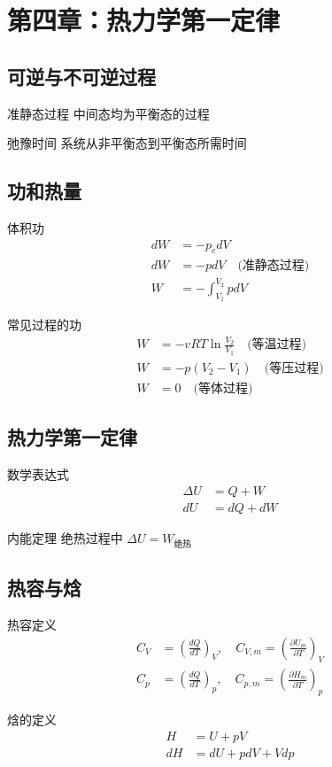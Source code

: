 \documentclass[12pt]{article}
\begin{document}
\section{第四章：热力学第一定律}
\subsection{可逆与不可逆过程}
准静态过程
中间态均为平衡态的过程

弛豫时间
系统从非平衡态到平衡态所需时间

\subsection{功和热量}
体积功
\begin{align*}
    dW &= -p_edV \\
    dW &= -pdV \quad \text{(准静态过程)} \\
    W &= -\int_{V_1}^{V_2} pdV
\end{align*}

常见过程的功
\begin{align*}
    W &= -vRT\ln\frac{V_2}{V_1} \quad \text{(等温过程)} \\
    W &= -p(V_2 - V_1) \quad \text{(等压过程)} \\
    W &= 0 \quad \text{(等体过程)}
\end{align*}

\subsection{热力学第一定律}
数学表达式
\begin{align*}
    \Delta U &= Q + W \\
    dU &= dQ + dW
\end{align*}

内能定理
绝热过程中 $\Delta U = W_{\text{绝热}}$

\subsection{热容与焓}
热容定义
\begin{align*}
    C_V &= \left(\frac{dQ}{dT}\right)_V, \quad C_{V,m} = \left(\frac{\partial U_m}{\partial T}\right)_V \\
    C_p &= \left(\frac{dQ}{dT}\right)_p, \quad C_{p,m} = \left(\frac{\partial H_m}{\partial T}\right)_p
\end{align*}

焓的定义
\begin{align*}
    H &= U + pV \\
    dH &= dU + pdV + Vdp
\end{align*}
\end{document}
